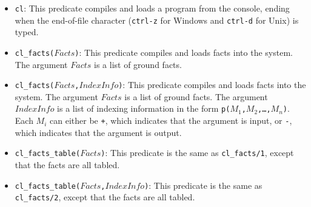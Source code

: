 \begin{itemize}
\item \texttt{cl}: This predicate compiles and loads a program from the console, ending when the end-of-file character ({\tt ctrl-z} for Windows and {\tt ctrl-d} for Unix) is typed.


\item \texttt{cl\_facts($Facts$)}: This predicate compiles and loads facts into the system.  The argument $Facts$ is a list of ground facts.

\item \texttt{cl\_facts($Facts$,$IndexInfo$)}: This predicate compiles and loads facts into the system.  The argument $Facts$ is a list of ground facts.  The argument $IndexInfo$ is a list of indexing information in the form \texttt{p($M_1$,$M_2$,\ldots,$M_n$)}.  Each $M_i$ can either be \texttt{+}, which indicates that the argument is input, or \texttt{-}, which indicates that the argument is output.

\item \texttt{cl\_facts\_table($Facts$)}: This predicate is the same as \texttt{cl\_facts/1}, except that the facts are all tabled.

\item \texttt{cl\_facts\_table($Facts$,$IndexInfo$)}: This predicate is the same as \texttt{cl\_facts/2}, except that the facts are all tabled.
\end{itemize}

